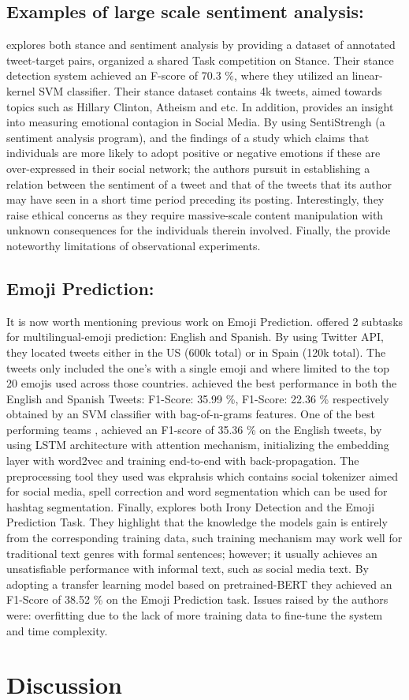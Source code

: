 \documentclass[11pt]{article}
\begin{document}
\subsection{Examples of large scale sentiment analysis:}
\cite{mohammad2017stance} explores both stance and sentiment analysis by providing a dataset of annotated tweet-target pairs, organized
a shared Task competition on Stance. Their stance detection system achieved an F-score of 70.3 \%, where they utilized an linear-kernel
SVM classifier. Their stance dataset contains 4k tweets, aimed towards topics such as Hillary Clinton, Atheism and etc. In addition,
\cite{yang2015twitter} provides an insight into measuring emotional contagion in Social Media. By using SentiStrengh (a sentiment analysis program),
and the findings of a study which claims that individuals are more likely to adopt positive or negative emotions if these are over-expressed in
their social network; the authors pursuit in establishing a relation between the sentiment of a tweet and that of the tweets that its author may have seen in a short
time period preceding its posting. Interestingly, they raise ethical concerns as they require massive-scale content manipulation with unknown consequences for the individuals therein involved.
Finally, the provide noteworthy limitations of observational experiments.

\subsection{Emoji Prediction:}
It is now worth mentioning previous work on Emoji Prediction. \cite{barbieri-etal-2018-semeval} offered 2 subtasks for multilingual-emoji prediction: English and Spanish. By using Twitter API,
they located tweets either in the US (600k total) or in Spain (120k total). The tweets only included the one's with a single emoji and where limited to the top 20 emojis used across those countries. \cite{Tubingen_Olso} achieved 
the best performance in both the English and Spanish Tweets: F1-Score: 35.99 \%, F1-Score: 22.36 \% respectively obtained by an SVM classifier with bag-of-n-grams features. One of the best performing teams 
\cite{baziotis-etal-2018-ntua-slp}, achieved an F1-score of 35.36 \% on the English tweets, by using LSTM architecture with attention mechanism, initializing the embedding layer with word2vec and training end-to-end with back-propagation. 
The preprocessing tool they used was ekprahsis \cite{baziotis-etal-2017-datastories-semeval} which contains social tokenizer aimed for social media, spell correction and word segmentation which can be used for hashtag segmentation. Finally, \cite{towards_understanding_creatieve_lang}
explores both Irony Detection and the Emoji Prediction Task. They highlight that the knowledge the models gain is entirely from the corresponding training data, such training mechanism may work well for traditional text genres with formal sentences; however; 
it usually achieves an unsatisfiable performance with informal text, such as social media text.  By adopting a transfer learning model based on pretrained-BERT they achieved an F1-Score of 38.52 \% on the Emoji Prediction task. Issues raised by the authors were: overfitting 
due to the lack of more training data to fine-tune the system and time complexity.  
\section{Discussion}
\label{sec:discussion}


%


\end{document}
